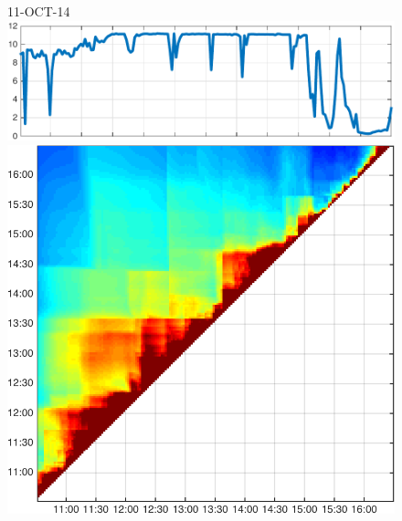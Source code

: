 \begin{figure}
\begin{minipage}[c]{\mylength}
\end{minipage}
\begin{minipage}[c]{\mylength}
\centering \scriptsize 11-OCT-14 \\
\includegraphics[valign=t,trim=0 0 5pt 0,angle=90,origin=tr,width=\sunintwidth,totalheight=\eventheight]{events/20141011-intensity.pdf}
\includegraphics[valign=t,width=\eventswidth]{events/20141011-maxGain-local-events.png}

\end{minipage}
\end{figure}
